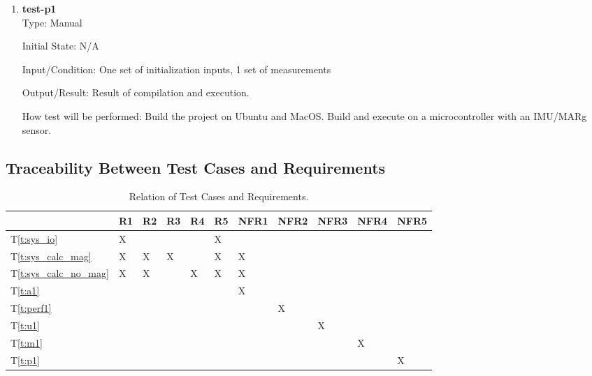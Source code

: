 \documentclass[12pt, titlepage]{article}
\newcommand{\testref}[1]{T\ref{#1}} \newcounter{testnum}
\newcommand{\Tthetestnum}{T\thetestnum}
\begin{document}
\begin{enumerate}

\item[\refstepcounter{testnum} \Tthetestnum \label{t:p1}:] \textbf{test-p1} \\

    Type: Manual

    Initial State: N/A

    Input/Condition: One set of initialization inputs, 1 set of measurements

    Output/Result: Result of compilation and execution.

    How test will be performed: Build the project on Ubuntu and MacOS. Build and execute \progname{}
    on a microcontroller with an IMU/MARg sensor.
\end{enumerate}

\subsection{Traceability Between Test Cases and Requirements}

\begin{table}[!h]
    \centering
    \caption{Relation of Test Cases and Requirements.}
    \label{tab:traceability}
    \begin{tabular}{|l|l|l|l|l|l|l|l|l|l|l|}
    \hline
      & R1 & R2 & R3 & R4 & R5 & NFR1 & NFR2 & NFR3 & NFR4 & NFR5 \\ \hline
    \testref{t:sys_io} & X  &    &  &  & X  &      &   &   &      &   \\ \hline
    \testref{t:sys_calc_mag} &  X  &  X & X & &  X  & X  &  &      &      &   \\ \hline
    \testref{t:sys_calc_no_mag} &   X &  X  &   & X & X & X  &  & &   &  \\ \hline
    \testref{t:a1} &    &    &    &  &  & X    &      &   &   &      \\ \hline
    \testref{t:perf1} &    &    &    &    &     & & X    &   &   &   \\ \hline
    \testref{t:u1} &    &    &    &    &  &   & & X    &   &      \\ \hline
    \testref{t:m1} &    &    &    &    &   &   &   &   & X    &      \\ \hline
    \testref{t:p1} &    &    &    &    &   &   &   &   &      & X    \\ \hline
    \end{tabular}
    \end{table}
\end{document}
